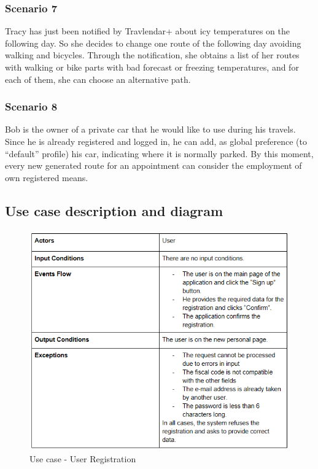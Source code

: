 	\subsubsection{Scenario 7}
	Tracy has just been notified by Travlendar+ about icy temperatures on the following day. So she decides to change one route of the following day avoiding walking and bicycles. Through the notification, she obtains a list of her routes with walking or bike parts with bad forecast or freezing temperatures, and for each of them, she can choose an alternative path.
	\subsubsection{Scenario 8}
	Bob is the owner of a private car that he would like to use during his travels. Since he is already registered and logged in, he can add, as global preference (to “default” profile) his car, indicating where it is normally parked. By this moment, every new generated route for an appointment can consider the employment of own registered means.
	
	
\subsection{Use case description and diagram}
\begin{figure} [H]
	\centering
	\includegraphics{Images/UseCaseTables/1_user_reg.PNG}
	\caption{\label{fig:useCase1}Use case - User Registration }
\end{figure}

